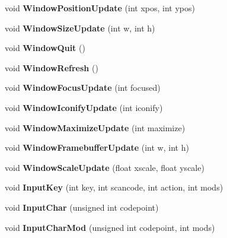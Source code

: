 \begin{DoxyCompactItemize}
void {\bfseries Window\+Position\+Update} (int xpos, int ypos)
\item 
\mbox{\label{class_window_a7b664a5df620fa39c22cfc9884482d29}} 
void {\bfseries Window\+Size\+Update} (int w, int h)
\item 
\mbox{\label{class_window_ab46b37bdc7b611bd7fc9f340eb62f159}} 
void {\bfseries Window\+Quit} ()
\item 
\mbox{\label{class_window_a58e40fd1e3b92a17702b8b3a3fe06558}} 
void {\bfseries Window\+Refresh} ()
\item 
\mbox{\label{class_window_a8ab9817d410bcd5cb38b831225b05bdb}} 
void {\bfseries Window\+Focus\+Update} (int focused)
\item 
\mbox{\label{class_window_a9935abc4249f320dc678672e01c5857e}} 
void {\bfseries Window\+Iconify\+Update} (int iconify)
\item 
\mbox{\label{class_window_ad8250d17af34609f5a943b1c8f0ae79c}} 
void {\bfseries Window\+Maximize\+Update} (int maximize)
\item 
\mbox{\label{class_window_abf47d308529d30971692d5657023a2b6}} 
void {\bfseries Window\+Framebuffer\+Update} (int w, int h)
\item 
\mbox{\label{class_window_ac61d3e5e90c003715c392db87fd9f3a8}} 
void {\bfseries Window\+Scale\+Update} (float xscale, float yscale)
\item 
\mbox{\label{class_window_a4e445b363631485cfaf0896daad5d831}} 
void {\bfseries Input\+Key} (int key, int scancode, int action, int mods)
\item 
\mbox{\label{class_window_a2b1d8043dc0d18aefd5bdf9f8a2a0540}} 
void {\bfseries Input\+Char} (unsigned int codepoint)
\item 
\mbox{\label{class_window_ae25bedbd8126864816b61e06f822dc2d}} 
void {\bfseries Input\+Char\+Mod} (unsigned int codepoint, int mods)
\item 
\mbox{\label{class_window_aba08569476d6ca6ceeb59deaf282d753}} 

\end{DoxyCompactItemize}
